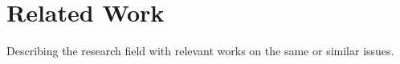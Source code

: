 \chapter{Related Work}
\label{sec:related}

Describing the research field with relevant works on the same or similar issues.

